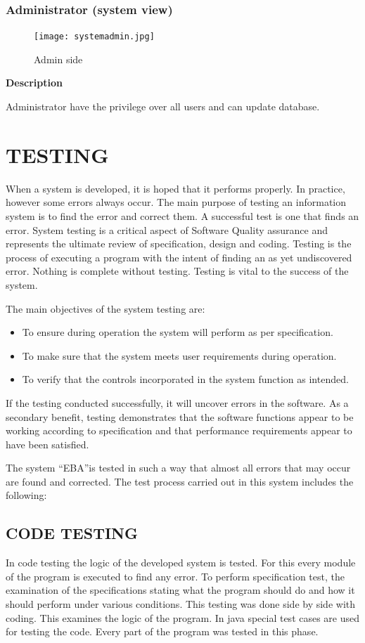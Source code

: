 \documentclass[12pt,a4paper,oneside]{report}
\newcommand{\quotes}[1]{``#1''}
\begin{document}
\newpage
\subsection{Administrator (system view)}
\begin{figure}[h]
	\begin{center}
		\texttt{[image: systemadmin.jpg]}
			\caption{Admin side}
			\label{Admin side}
	\end{center}
\end{figure}
\textbf{Description}
\par  Administrator have the privilege over all users and can update database. 

\chapter{TESTING}
\par When a system is developed, it is hoped that it performs properly. In practice, however some errors always occur. The main purpose of testing an information system is to find the error and correct them. A successful test is one that finds an error. System testing is a critical aspect of Software Quality assurance and represents the ultimate review of specification, design and coding. Testing is the process of executing a program with the intent of finding an as yet undiscovered error. Nothing is complete without testing. Testing is vital to the success of the system.
\par The main objectives of the system testing are:
\begin{itemize}
\item To ensure during operation the system will perform as per specification.
\item To make sure that the system meets user requirements during operation.
\item To verify that the controls incorporated in the system function as intended.
 \end{itemize}
\par If the testing conducted successfully, it will uncover errors in the software. As a secondary benefit, testing demonstrates that the software functions appear to be working according to specification and that performance requirements appear to have been satisfied.
\par The system \quotes{EBA}is tested in such a way that almost all errors that may occur are found and corrected. The test process carried out in this system includes the following:
\section{CODE TESTING}
\par In code testing the logic of the developed system is tested. For this every module of the program is executed to find any error. To perform specification test, the examination of the specifications stating what the program should do and how it should perform under various conditions. This testing was done side by side with coding. This examines the logic of the program. In java special test cases are used for testing the code. Every part of the program was tested in this phase.
\end{document}
